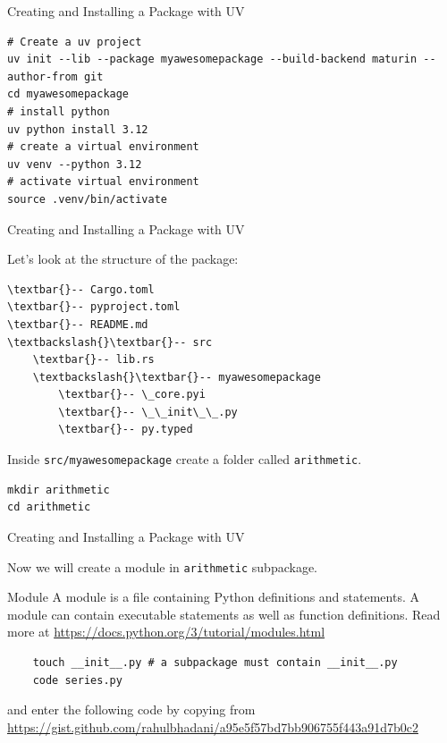\documentclass[aspectratio=169,xcolor=dvipsnames,svgnames,x11names,fleqn]{beamer}
\begin{document}
\begin{frame}[containsverbatim]{Creating and Installing a Package with UV}

\begin{verbatim}
# Create a uv project
uv init --lib --package myawesomepackage --build-backend maturin --author-from git
cd myawesomepackage
# install python
uv python install 3.12
# create a virtual environment
uv venv --python 3.12
# activate virtual environment
source .venv/bin/activate
    \end{verbatim}
    
\end{frame}


\begin{frame}[containsverbatim]{Creating and Installing a Package with UV}

Let's look at the structure of the package:

\begin{Verbatim}[commandchars=\\\{\}]
\textbar{}-- Cargo.toml
\textbar{}-- pyproject.toml
\textbar{}-- README.md
\textbackslash{}\textbar{}-- src
    \textbar{}-- lib.rs
    \textbackslash{}\textbar{}-- myawesomepackage
        \textbar{}-- \_core.pyi
        \textbar{}-- \_\_init\_\_.py
        \textbar{}-- py.typed
\end{Verbatim}

Inside \texttt{src/myawesomepackage} create a folder called \texttt{arithmetic}.

\begin{verbatim}
mkdir arithmetic
cd arithmetic
\end{verbatim}
\end{frame}

\begin{frame}[containsverbatim]{Creating and Installing a Package with UV}

Now we will create a module in \texttt{arithmetic} subpackage.

\begin{tblock}{Module}
    A module is a file containing Python definitions and statements. A module can contain executable statements as well as function definitions. Read more at \url{https://docs.python.org/3/tutorial/modules.html}
\end{tblock}

\begin{verbatim}
    touch __init__.py # a subpackage must contain __init__.py
    code series.py
\end{verbatim}

and enter the following code by copying from \url{https://gist.github.com/rahulbhadani/a95e5f57bd7bb906755f443a91d7b0c2}



\end{frame}
\end{document}
